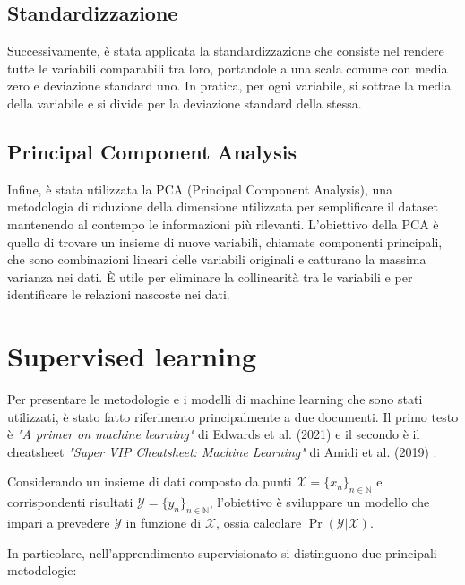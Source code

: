 \subsection{Standardizzazione}

Successivamente, è stata applicata la standardizzazione che consiste nel rendere tutte le variabili comparabili tra loro, portandole a una scala comune con media zero e deviazione standard uno. In pratica, per ogni variabile, si sottrae la media della variabile e si divide per la deviazione standard della stessa.

\subsection{Principal Component Analysis}

Infine, è stata utilizzata la PCA (Principal Component Analysis), una metodologia di riduzione della dimensione utilizzata per semplificare il dataset mantenendo al contempo le informazioni più rilevanti. L'obiettivo della PCA è quello di trovare un insieme di nuove variabili, chiamate componenti principali, che sono combinazioni lineari delle variabili originali e catturano la massima varianza nei dati. È utile per eliminare la collinearità tra le variabili e per identificare le relazioni nascoste nei dati.

\section{Supervised learning}

Per presentare le metodologie e i modelli di machine learning che sono stati utilizzati, è stato fatto riferimento principalmente a due documenti. Il primo testo è \textit{"A primer on machine learning"} di Edwards et al. (2021) \cite{edwards2021primer} e il secondo è il cheatsheet \textit{"Super VIP Cheatsheet: Machine Learning"} di Amidi et al. (2019) \cite{amidi2018super}.

\bigskip

Considerando un insieme di dati composto da punti \( \mathcal{X} = \{ x_n \}_{n \in \mathbb{N}} \) e corrispondenti risultati \( \mathcal{Y} = \{ y_n \}_{n \in \mathbb{N}} \), l'obiettivo è sviluppare un modello che impari a prevedere \( \mathcal{Y} \) in funzione di \( \mathcal{X} \), ossia calcolare \( \Pr(\mathcal{Y}|\mathcal{X}) \).

\bigskip

In particolare, nell'apprendimento supervisionato si distinguono due principali metodologie:

